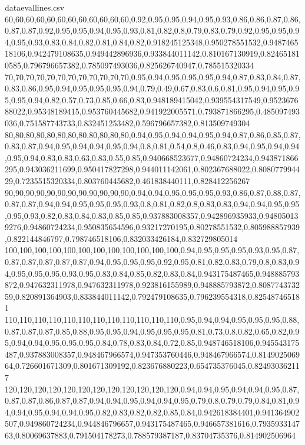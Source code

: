 \documentclass{llncs}
\begin{document}
\begin{filecontents*}{dataevallines.csv}
	60,60,60,60,60,60,60,60,60,60,60,60,0.92,0.95,0.95,0.94,0.95,0.93,0.86,0.86,0.87,0.86,0.87,0.87,0.92,0.95,0.95,0.94,0.95,0.93,0.81,0.82,0.8,0.79,0.83,0.79,0.92,0.95,0.95,0.94,0.95,0.93,0.83,0.84,0.82,0.81,0.84,0.82,0.918245125348,0.950278551532,0.948746518106,0.942479108635,0.949442896936,0.933844011142,0.810167130919,0.824651810585,0.796796657382,0.785097493036,0.825626740947,0.785515320334
	70,70,70,70,70,70,70,70,70,70,70,70,0.95,0.94,0.95,0.95,0.95,0.94,0.87,0.83,0.84,0.87,0.83,0.86,0.95,0.94,0.95,0.95,0.95,0.94,0.79,0.49,0.67,0.83,0.6,0.81,0.95,0.94,0.95,0.95,0.95,0.94,0.82,0.57,0.73,0.85,0.66,0.83,0.948189415042,0.939554317549,0.952367688022,0.95348189415,0.953760445682,0.941922005571,0.793871866295,0.485097493036,0.751587743733,0.832451253482,0.596796657382,0.813509749304
	80,80,80,80,80,80,80,80,80,80,80,80,0.94,0.95,0.94,0.94,0.95,0.94,0.87,0.86,0.85,0.87,0.83,0.87,0.94,0.95,0.94,0.94,0.95,0.94,0.8,0.81,0.54,0.8,0.46,0.83,0.94,0.95,0.94,0.94,0.95,0.94,0.83,0.83,0.63,0.83,0.55,0.85,0.940668523677,0.94860724234,0.943871866295,0.943036211699,0.950417827298,0.944011142061,0.802367688022,0.808077994429,0.7235515320334,0.803760445682,0.461838440111,0.828412256267
	90,90,90,90,90,90,90,90,90,90,90,90,0.94,0.94,0.95,0.95,0.95,0.93,0.86,0.87,0.88,0.87,0.87,0.87,0.94,0.94,0.95,0.95,0.95,0.93,0.8,0.81,0.82,0.8,0.83,0.83,0.94,0.94,0.95,0.95,0.95,0.93,0.82,0.83,0.84,0.83,0.85,0.85,0.937883008357,0.942896935933,0.948050139276,0.94860724234,0.950835654596,0.93217270195,0.80278551532,0.805988857939,0.822144846797,0.798746518106,0.832033426184,0.832729805014
	100,100,100,100,100,100,100,100,100,100,100,100,0.94,0.95,0.95,0.95,0.93,0.95,0.87,0.87,0.87,0.87,0.87,0.87,0.94,0.95,0.95,0.95,0.92,0.95,0.81,0.82,0.83,0.79,0.8,0.83,0.94,0.95,0.95,0.95,0.93,0.95,0.83,0.84,0.85,0.82,0.83,0.84,0.943175487465,0.948885793872,0.947632311978,0.947632311978,0.923816155989,0.948885793872,0.808774373259,0.820891364903,0.833844011142,0.792479108635,0.796239554318,0.825487465181
	110,110,110,110,110,110,110,110,110,110,110,110,0.95,0.94,0.94,0.95,0.95,0.95,0.88,0.87,0.87,0.87,0.85,0.88,0.95,0.95,0.94,0.95,0.95,0.95,0.81,0.73,0.8,0.82,0.65,0.82,0.95,0.94,0.94,0.95,0.95,0.95,0.84,0.78,0.83,0.84,0.72,0.85,0.948746518106,0.945543175487,0.937883008357,0.948467966574,0.947353760446,0.948467966574,0.814902506964,0.726601671309,0.801671309192,0.823676880223,0.654735376045,0.824930362117
	120,120,120,120,120,120,120,120,120,120,120,120,0.94,0.94,0.95,0.94,0.94,0.95,0.87,0.87,0.87,0.86,0.87,0.87,0.94,0.94,0.95,0.94,0.94,0.95,0.79,0.8,0.79,0.79,0.84,0.81,0.94,0.94,0.95,0.94,0.94,0.95,0.82,0.83,0.82,0.82,0.85,0.84,0.942618384401,0.941364902507,0.949860724234,0.944846796657,0.943175487465,0.946657381616,0.793593314763,0.80069637883,0.791504178273,0.788579387187,0.83704735376,0.814902506964

\end{filecontents*}
\end{document}
